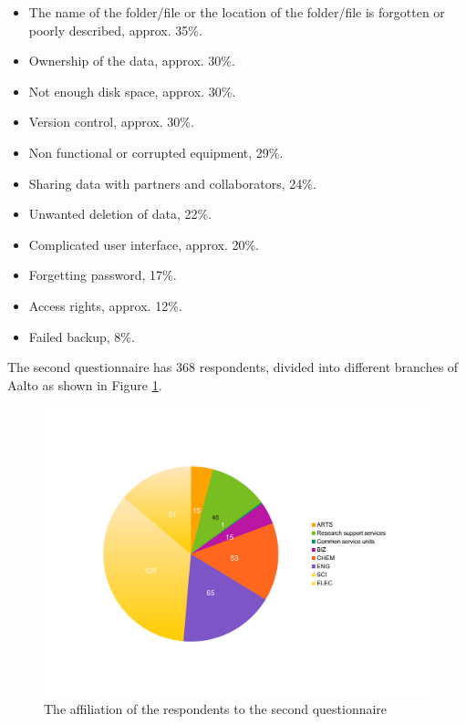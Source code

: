 \begin{itemize}
    \item The name of the folder/file or the location of the folder/file is
          forgotten or poorly described, approx. 35\%.
    \item Ownership of the data, approx. 30\%.
    \item Not enough disk space, approx. 30\%.
    \item Version control, approx. 30\%.
    \item Non functional or corrupted equipment, 29\%.
    \item Sharing data with partners and collaborators, 24\%.
    \item Unwanted deletion of data, 22\%.
    \item Complicated user interface, approx. 20\%.
    \item Forgetting password, 17\%.
    \item Access rights, approx. 12\%.
    \item Failed backup, 8\%.
\end{itemize}

The second questionnaire has 368 respondents, divided into different branches
of Aalto as shown in Figure \ref{fig:answers_branches}.


\begin{figure}
    \begin{centering}
        \includegraphics[width=\textwidth]{images/answers_branches}
    \end{centering}
    \caption{The affiliation of the respondents to the second questionnaire}
    \label{fig:answers_branches}
\end{figure}

